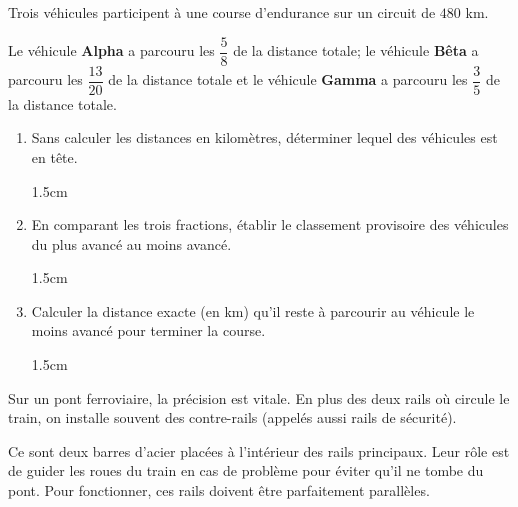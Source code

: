 \documentclass[a4paper]{book}
\begin{document}
{    \medskip

    \begin{exercice}
        Trois véhicules participent à une course d'endurance sur un circuit de $480$ km.
        
        Le véhicule \textbf{Alpha} a parcouru les $\dfrac{5}{8}$ de la distance totale; 
        le véhicule \textbf{Bêta} a parcouru les $\dfrac{13}{20}$ de la distance totale
        et le véhicule \textbf{Gamma} a parcouru les $\dfrac{3}{5}$ de la distance totale.


\newpage


        \begin{enumerate}
            \item Sans calculer les distances en kilomètres, déterminer lequel des véhicules est en tête.

            \begin{ZoneReponse}{1.5cm}\end{ZoneReponse}
            
            \item En comparant les trois fractions, établir le classement provisoire des véhicules du plus avancé au moins avancé.

            \begin{ZoneReponse}{1.5cm}\end{ZoneReponse}
            
            \item Calculer la distance exacte (en km) qu'il reste à parcourir au véhicule le moins avancé pour terminer la course.

            \begin{ZoneReponse}{1.5cm}\end{ZoneReponse}
        \end{enumerate}
    \end{exercice}


    \begin{exercice}
        \begin{minipage}{0.65\linewidth}
            Sur un pont ferroviaire, la précision est vitale. En plus des deux rails où circule le train, on installe souvent des contre-rails (appelés aussi rails de sécurité). 
    
            \smallskip
            
            Ce sont deux barres d'acier placées à l'intérieur des rails principaux. Leur rôle est de guider les roues du train en cas de problème pour éviter qu'il ne tombe du pont. Pour fonctionner, ces rails doivent être parfaitement parallèles. 
            

\end{minipage}
\end{exercice}}
\end{document}
